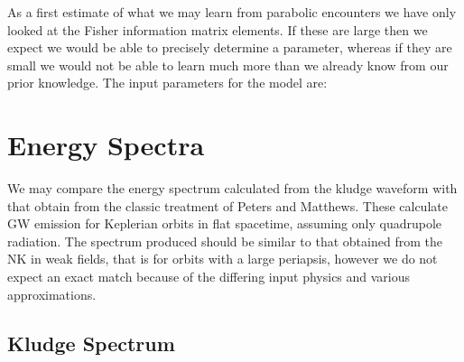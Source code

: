 \documentclass[a4paper, 11pt, titlepage, twoside]{report}
\begin{document}
{As a first estimate of what we may learn from parabolic encounters we have only looked at the Fisher information matrix elements. If these are large then we expect we would be able to precisely determine a parameter, whereas if they are small we would not be able to learn much more than we already know from our prior knowledge. The input parameters for the model are:

\section{Energy Spectra}

We may compare the energy spectrum calculated from the kludge waveform with that obtain from the classic treatment of Peters and Matthews\cite{Peters1963, Peters1964}. These calculate GW emission for Keplerian orbits in flat spacetime, assuming only quadrupole radiation. The spectrum produced should be similar to that obtained from the NK in weak fields, that is for orbits with a large periapsis, however we do not expect an exact match because of the differing input physics and various approximations.

\subsection{Kludge Spectrum}

}
\end{document}
